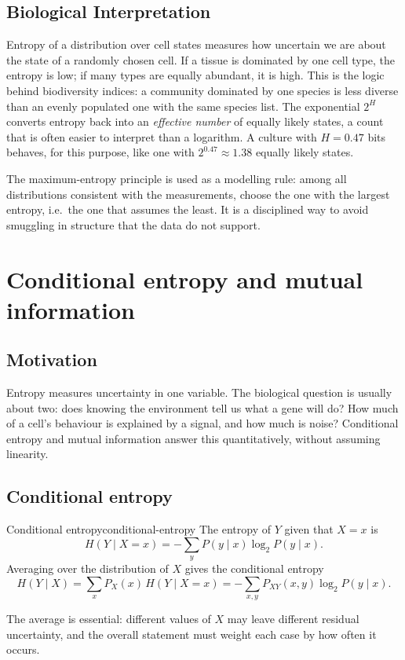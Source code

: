 \subsection*{Biological Interpretation}
Entropy of a distribution over cell states measures how uncertain we are about the state of a randomly chosen cell. If a tissue is dominated by one cell type, the entropy is low; if many types are equally abundant, it is high. This is the logic behind biodiversity indices: a community dominated by one species is less diverse than an evenly populated one with the same species list. The exponential $2^{H}$ converts entropy back into an \emph{effective number} of equally likely states, a count that is often easier to interpret than a logarithm. A culture with $H=0.47$ bits behaves, for this purpose, like one with $2^{0.47}\approx1.38$ equally likely states.

The maximum-entropy principle is used as a modelling rule: among all distributions consistent with the measurements, choose the one with the largest entropy, i.e.\ the one that assumes the least. It is a disciplined way to avoid smuggling in structure that the data do not support.

\section{Conditional entropy and mutual information}\label{sec:lec02:mi}

\subsection*{Motivation}
Entropy measures uncertainty in one variable. The biological question is usually about two: does knowing the environment tell us what a gene will do? How much of a cell's behaviour is explained by a signal, and how much is noise? Conditional entropy and mutual information answer this quantitatively, without assuming linearity.

\subsection{Conditional entropy}\label{subsec:lec02:conditional-entropy}
\begin{definition}{Conditional entropy}{conditional-entropy}
The entropy of $Y$ given that $X=x$ is
\begin{equation}\label{eq:lec02:conditional-entropy-x}
H(Y\mid X=x)=-\sum_yP(y\mid x)\log_2P(y\mid x).
\end{equation}
Averaging over the distribution of $X$ gives the conditional entropy
\begin{equation}\label{eq:lec02:conditional-entropy}
H(Y\mid X)=\sum_xP_X(x)\,H(Y\mid X=x)
=-\sum_{x,y}P_{XY}(x,y)\log_2P(y\mid x).
\end{equation}
\end{definition}
The average is essential: different values of $X$ may leave different residual uncertainty, and the overall statement must weight each case by how often it occurs.


